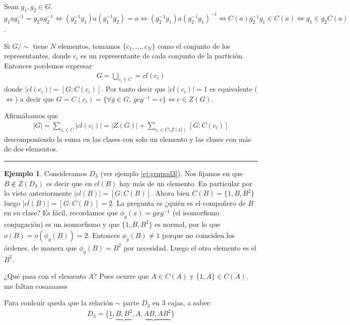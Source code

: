 \documentclass{book}
\theoremstyle{definition}
\newtheorem{ej}{Ejemplo}
\theoremstyle{remark}
\newcommand{\inv}[1]{#1^{-1}}
\newcommand{\hr}{\rule{\textwidth}{.4pt}}
\begin{document}
Sean $g_1, g_2 \in G$. $g_1a\inv{g_1} = g_2a\inv{g_2} \iff (\inv{g_2}g_1)a(\inv{g_1}g_2) = a \iff (\inv{g_2}g_1)a\inv{(\inv{g_2}g_1)} \iff C(a) \inv{g_2}g_1 \in C(a) \iff g_1 \in g_2C(a)$.

Si $G/\sim$ tiene $N$ elementos, tomamos $\{c_1, \dots, c_N\}$ como el conjunto de los representantes, donde $c_i$ es un representante de cada conjunto de la partición. Entonces pordemos expresar
\begin{align*}
	G = \bigcup_{c_i \in C} = cl(c_i)
\end{align*}
donde $|cl(c_i)| = [G:C(c_i)]$. Por tanto decir que $|cl(c_i)| = 1$ es equivalente ($\iff$) a decir que $G = C(c_i) = \{\forall g \in G,\ gc\inv{g} = c\} \iff c \in Z(G)$.

Afirmábamos que
\begin{align*}
	|G| = \sum_{c_i \in C} |cl(c_i)| = |Z(G)| + \sum_{c_i \in C\setminus Z(G)} [G:C(c_i)]
\end{align*}
descomponiendo la suma en las clases con solo un elemento y las clases con más de dos elementos.

\hr

\begin{ej}
	Consideramos $D_3$ (ver ejemplo \ref{ej:grupod3}). Nos fijamos en que $B \not\in Z(D_3)$ es decir que en $cl(B)$ hay más de un elemento. En particular por lo visto anteriormente $|cl(B)| = [G:C(B)]$. Ahora bien $C(B) = \{1, B, B^2\}$ luego $|cl(B)| = [G:C(B)] = 2$. La pregunta es ¿quién es el compañero de $B$ en su clase? Es fácil, recordamos que $\phi_g (x) = gx\inv{g}$ (el isomorfismo conjugación) es un isomorfismo y que $\{1, B, B^2\}$ es normal, por lo que $o(B) = o(\phi_g(B)) = 2$. Entonces $\phi_g(B) \neq 1$ porque no coinciden los órdenes, de manera que $\phi_g(B) = B^2$ por necesidad. Luego el otro elemento es el $B^2$.
	
	¿Qué pasa con el elemento $A$? Pues ocurre que $A \in C(A)$ y $\{1, A\} \in C(A)$. me faltan cosaaaasss
	
	Para conlcuir queda que la relación $\sim$ parte $D_3$ en 3 cajas, a saber:
	\begin{align*}
		D_3 = \{\underbrace{1}, \underbrace{B, B^2}, \underbrace{A, AB, AB^2}\}
	\end{align*}
\end{ej}
\end{document}
